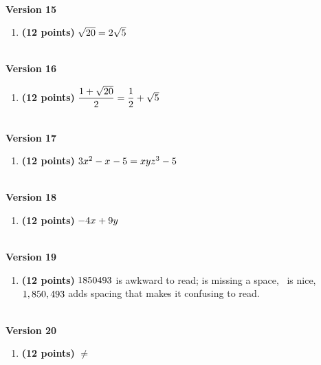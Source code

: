 \documentclass[12pt]{amsart}
\begin{document}
\begin{enumerate}[resume]
\vfill 
 \end{enumerate}$ $ \\ {\bf Version 15} \\\begin{enumerate}[resume]
\item {\bf (12 points)} 
  $\sqrt{20} = 2 \sqrt{5}$ 
\vfill 
 \end{enumerate}$ $ \\ {\bf Version 16} \\\begin{enumerate}[resume]
\item {\bf (12 points)} 
 $\dfrac{1+\sqrt{\rootfourtwo}}{2} = \dfrac{1}{2} + \ifthenelse{\wowfourtwo = 1}{}{\wowfourtwo} \sqrt{\infourtwo}$

\vfill 
 \end{enumerate}$ $ \\ {\bf Version 17} \\\begin{enumerate}[resume]
\item {\bf (12 points)} 
  $3x^{2}-x^{}-5 = xyz^{3}-5$ 
\vfill 
 \end{enumerate}$ $ \\ {\bf Version 18} \\\begin{enumerate}[resume]
\item {\bf (12 points)} 
  $-4x^{} +9y^{}$ 
\vfill 
 \end{enumerate}$ $ \\ {\bf Version 19} \\\begin{enumerate}[resume]
\item {\bf (12 points)} 
 $1850493$ is awkward to read; \nicefourfour is missing a space, \nicefourfour\ is nice, $1,850,493$ adds spacing that makes it confusing to read. 
\vfill 
 \end{enumerate}$ $ \\ {\bf Version 20} \\\begin{enumerate}[resume]
\item {\bf (12 points)} 
  \goodfourfour $\neq$ \badfourfour 
\vfill 

\end{enumerate}
\end{document}
